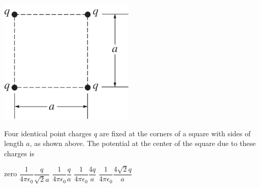 \begin{center}
\includegraphics[scale=0.5]{images/img-010-031.png}
\end{center}

\begin{questions}\setcounter{question}{33}\question
Four identical point charges $q$ are fixed at the corners of a square with sides of length $a$, as shown above. The potential at the center of the square due to these charges is

\begin{oneparchoices}
\choice zero
\choice $\dfrac{1}{4 \pi \epsilon_{0}} \dfrac{q}{\sqrt{2} a} $
\choice $\dfrac{1}{4 \pi \epsilon_{0}} \dfrac{q}{a}$
\choice $\dfrac{1}{4 \pi \epsilon_{0}} \dfrac{4 q}{a}$
\choice $\dfrac{1}{4 \pi \epsilon_{0}} \dfrac{4 \sqrt{2} q}{a}$
\end{oneparchoices}\end{questions}

